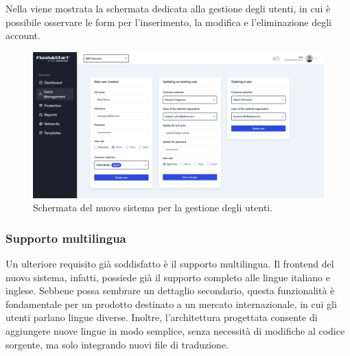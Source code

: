 Nella  viene mostrata la schermata dedicata alla gestione degli utenti, in cui è possibile osservare le form per l’inserimento, la modifica e l’eliminazione degli account.

\begin{figure}
  \centering
  \includegraphics[width=1\textwidth]{figures/new-user-panel.png}
  \caption{Schermata del nuovo sistema per la gestione degli utenti.}
  \label{fig:user-management}
\end{figure}

\subsubsection{Supporto multilingua}
Un ulteriore requisito già soddisfatto è il supporto multilingua. Il frontend del nuovo sistema, infatti, possiede già il supporto completo alle lingue italiano e inglese. Sebbene possa sembrare un dettaglio secondario, questa funzionalità è fondamentale per un prodotto destinato a un mercato internazionale, in cui gli utenti parlano lingue diverse. Inoltre, l’architettura progettata consente di aggiungere nuove lingue in modo semplice, senza necessità di modifiche al codice sorgente, ma solo integrando nuovi file di traduzione.

